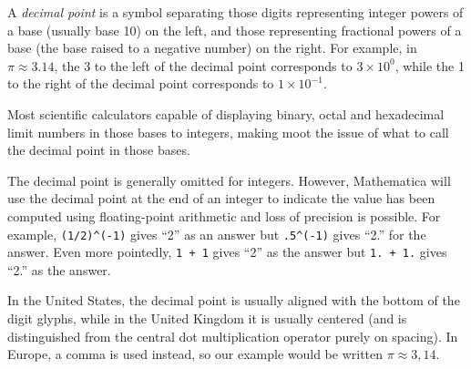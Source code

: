 \documentclass[12pt]{article}
\begin{document}
A {\em decimal point} is a symbol separating those digits representing integer powers of a base (usually base 10) on the left, and those representing fractional powers of a base (the base raised to a negative number) on the right. For example, in $\pi \approx 3.14$, the 3 to the left of the decimal point corresponds to $3 \times 10^0$, while the 1 to the right of the decimal point corresponds to $1 \times 10^{-1}$.

Most scientific calculators capable of displaying binary, octal and hexadecimal limit numbers in those bases to integers, making moot the issue of what to call the decimal point in those bases.

The decimal point is generally omitted for integers. However, Mathematica will use the decimal point at the end of an integer to indicate the value has been computed using floating-point arithmetic and loss of precision is possible. For example, \verb=(1/2)^(-1)= gives ``2'' as an answer but \verb=.5^(-1)= gives ``2.'' for the answer. Even more pointedly, \verb=1 + 1= gives ``2'' as the answer but \verb=1. + 1.= gives ``2.'' as the answer.

In the United States, the decimal point is usually aligned with the bottom of the digit glyphs, while in the United Kingdom it is usually centered (and is distinguished from the central dot multiplication operator purely on spacing). In Europe, a comma is used instead, so our example would be written $\pi \approx 3,\!14$.
\end{document}
